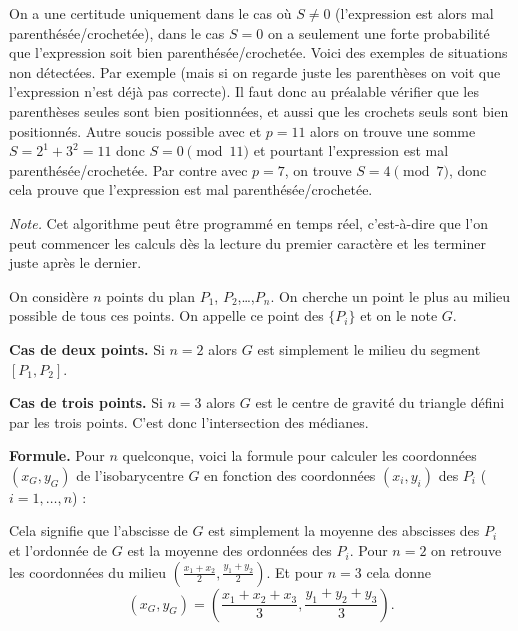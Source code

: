\documentclass[10pt,class=report,crop=false]{standalone}
\begin{document}
\begin{activite}
On a une certitude uniquement dans le cas où $S\neq0$ (l'expression est alors mal parenthésée/crochetée),
dans le cas $S=0$ on a seulement une forte probabilité que l'expression soit bien parenthésée/crochetée.
Voici des exemples de situations non détectées. Par exemple  (mais si on regarde juste les parenthèses on voit que l'expression n'est déjà pas correcte). Il faut donc au préalable vérifier que les parenthèses seules sont bien positionnées, et aussi que les crochets seuls sont bien positionnés. 
Autre soucis possible avec \ci{"(["} et $p=11$ alors on trouve une somme $S=2^1+3^2=11$ donc 
$S=0 \pmod{11}$ et pourtant l'expression est mal parenthésée/crochetée.
Par contre avec $p=7$, on trouve $S=4 \pmod{7}$, donc cela prouve que l'expression est mal parenthésée/crochetée.

\emph{Note.} Cet algorithme peut être programmé en temps réel, c'est-à-dire que l'on peut commencer les calculs dès la lecture du premier caractère et les terminer juste après le dernier.
\end{activite}





\begin{cours}[Isobarycentre]


On considère $n$ points du plan $P_1$, $P_2$,\ldots,$P_n$.
On cherche un point \og{}le plus au milieu possible\fg{} de tous ces points. On appelle ce point  des $\{P_i\}$ et on le note $G$.


\textbf{Cas de deux points.} Si $n=2$ alors
	$G$ est simplement le milieu du segment $[P_1,P_2]$.
	
\textbf{Cas de trois points.} Si $n=3$ alors
$G$ est le centre de gravité du triangle défini par les trois points. C'est donc l'intersection des médianes.	
	

	

	
\textbf{Formule.}
Pour $n$ quelconque, voici la formule pour calculer les coordonnées $(x_G,y_G)$ de l'isobarycentre $G$ en fonction des coordonnées $(x_i,y_i)$ des $P_i$ ($i=1,\ldots,n$) :




Cela signifie que l'abscisse de $G$ est simplement la moyenne des abscisses des $P_i$ et l'ordonnée de $G$ est la moyenne des ordonnées des $P_i$.
Pour $n=2$ on retrouve les coordonnées du milieu $\left(\frac{x_1+x_2}{2}, \frac{y_1+y_2}{2}\right)$. Et pour $n=3$ cela donne 
$$(x_G,y_G) = \left(\frac{x_1+x_2+x_3}{3},\frac{y_1+y_2+y_3}{3}\right).$$

\end{cours}
\end{document}
